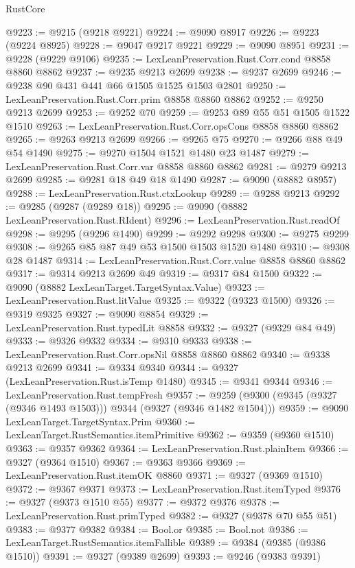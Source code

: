 \begin{lexlean}{RustCore}
\begin{coremodule}
@9223 := @9215 (@9218 @9221)
@9224 := @9090 @8917
@9226 := @9223 (@9224 @8925)
@9228 := @9047 @9217 @9221
@9229 := @9090 @8951
@9231 := @9228 (@9229 @9106)
@9235 := LexLeanPreservation.Rust.Corr.cond @8858 @8860 @8862
@9237 := @9235 @9213 @2699
@9238 := @9237 @2699
@9246 := @9238 @90 @431 @441 @66 @1505 @1525 @1503 @2801
@9250 := LexLeanPreservation.Rust.Corr.prim @8858 @8860 @8862
@9252 := @9250 @9213 @2699
@9253 := @9252 @70
@9259 := @9253 @89 @55 @51 @1505 @1522 @1510
@9263 := LexLeanPreservation.Rust.Corr.opsCons @8858 @8860 @8862
@9265 := @9263 @9213 @2699
@9266 := @9265 @75
@9270 := @9266 @88 @49 @54 @1490
@9275 := @9270 @1504 @1521 @1480 @23 @1487
@9279 := LexLeanPreservation.Rust.Corr.var @8858 @8860 @8862
@9281 := @9279 @9213 @2699
@9285 := @9281 @18 @49 @18 @1490
@9287 := @9090 (@8882 @8957)
@9288 := LexLeanPreservation.Rust.ctxLookup
@9289 := @9288 @9213
@9292 := @9285 (@9287 (@9289 @18))
@9295 := @9090 (@8882 LexLeanPreservation.Rust.RIdent)
@9296 := LexLeanPreservation.Rust.readOf
@9298 := @9295 (@9296 @1490)
@9299 := @9292 @9298
@9300 := @9275 @9299
@9308 := @9265 @85 @87 @49 @53 @1500 @1503 @1520 @1480
@9310 := @9308 @28 @1487
@9314 := LexLeanPreservation.Rust.Corr.value @8858 @8860 @8862
@9317 := @9314 @9213 @2699 @49
@9319 := @9317 @84 @1500
@9322 := @9090 (@8882 LexLeanTarget.TargetSyntax.Value)
@9323 := LexLeanPreservation.Rust.litValue
@9325 := @9322 (@9323 @1500)
@9326 := @9319 @9325
@9327 := @9090 @8854
@9329 := LexLeanPreservation.Rust.typedLit @8858
@9332 := @9327 (@9329 @84 @49)
@9333 := @9326 @9332
@9334 := @9310 @9333
@9338 := LexLeanPreservation.Rust.Corr.opsNil @8858 @8860 @8862
@9340 := @9338 @9213 @2699
@9341 := @9334 @9340
@9344 := @9327 (LexLeanPreservation.Rust.isTemp @1480)
@9345 := @9341 @9344
@9346 := LexLeanPreservation.Rust.tempFresh
@9357 := @9259 (@9300 (@9345 (@9327 (@9346 @1493 @1503))) @9344 (@9327 (@9346 @1482 @1504)))
@9359 := @9090 LexLeanTarget.TargetSyntax.Prim
@9360 := LexLeanTarget.RustSemantics.itemPrimitive
@9362 := @9359 (@9360 @1510)
@9363 := @9357 @9362
@9364 := LexLeanPreservation.Rust.plainItem
@9366 := @9327 (@9364 @1510)
@9367 := @9363 @9366
@9369 := LexLeanPreservation.Rust.itemOK @8860
@9371 := @9327 (@9369 @1510)
@9372 := @9367 @9371
@9373 := LexLeanPreservation.Rust.itemTyped
@9376 := @9327 (@9373 @1510 @55)
@9377 := @9372 @9376
@9378 := LexLeanPreservation.Rust.primTyped
@9382 := @9327 (@9378 @70 @55 @51)
@9383 := @9377 @9382
@9384 := Bool.or
@9385 := Bool.not
@9386 := LexLeanTarget.RustSemantics.itemFallible
@9389 := @9384 (@9385 (@9386 @1510))
@9391 := @9327 (@9389 @2699)
@9393 := @9246 (@9383 @9391)

\end{coremodule}
\end{lexlean}
